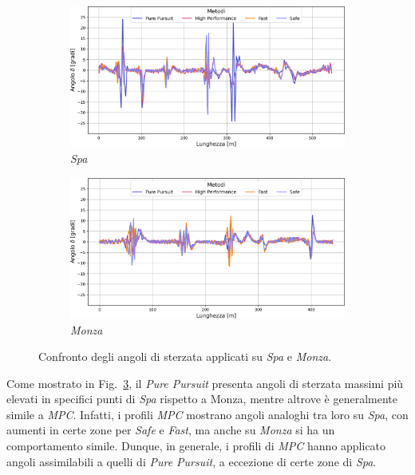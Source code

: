 \begin{figure}[H]
    \centering
    \begin{subfigure}{\textwidth}
        \centering
        \includegraphics[scale=0.4]{images/spa_mpc_theta_comparisons.png} 
        \caption{\textit{Spa}}
        \label{fig:delta_comp_spa}
    \end{subfigure}
    \begin{subfigure}{\textwidth}
        \centering
        \includegraphics[scale=0.4]{images/monza_mpc_theta_comparisons.png}
        \caption{\textit{Monza}}
        \label{fig:delta_comp_monza}
    \end{subfigure}
    \caption{Confronto degli angoli di sterzata applicati su \textit{Spa} e \textit{Monza}.}
    \label{fig:fig22} %
\end{figure}
Come mostrato in Fig.~\ref{fig:fig22}, il \textit{Pure Pursuit} presenta 
angoli di sterzata massimi più elevati in specifici punti di \textit{Spa} 
rispetto a Monza, mentre altrove è generalmente simile a \textit{MPC}.
Infatti, i profili \textit{MPC} mostrano angoli analoghi tra loro
su \textit{Spa}, con aumenti in certe zone per \textit{Safe} e 
\textit{Fast}, ma anche su \textit{Monza} si ha un comportamento simile. 
Dunque, in generale, i profili di \textit{MPC} hanno applicato angoli
assimilabili a quelli di \textit{Pure Pursuit}, a eccezione di certe zone di \textit{Spa}.